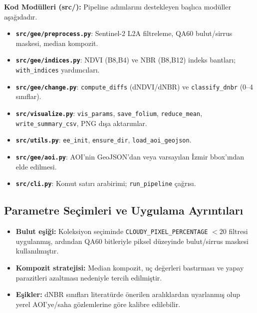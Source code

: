 \documentclass[11pt,a4paper]{article}
\begin{document}
\noindent\textbf{Kod Modülleri (src/):} Pipeline adımlarını destekleyen başlıca modüller aşağıdadır.
\begin{itemize}
  \item \textbf{\texttt{src/gee/preprocess.py}}: Sentinel-2 L2A filtreleme, QA60 bulut/sirrus maskesi, median kompozit.
  \item \textbf{\texttt{src/gee/indices.py}}: NDVI (B8,B4) ve NBR (B8,B12) indeks bantları; \texttt{with\_indices} yardımcıları.
  \item \textbf{\texttt{src/gee/change.py}}: \texttt{compute\_diffs} (dNDVI/dNBR) ve \texttt{classify\_dnbr} (0--4 sınıflar).
  \item \textbf{\texttt{src/visualize.py}}: \texttt{vis\_params}, \texttt{save\_folium}, \texttt{reduce\_mean}, \texttt{write\_summary\_csv}, PNG dışa aktarımlar.
  \item \textbf{\texttt{src/utils.py}}: \texttt{ee\_init}, \texttt{ensure\_dir}, \texttt{load\_aoi\_geojson}.
  \item \textbf{\texttt{src/gee/aoi.py}}: AOI'nin GeoJSON'dan veya varsayılan İzmir bbox'ından elde edilmesi.
  \item \textbf{\texttt{src/cli.py}}: Komut satırı arabirimi; \texttt{run\_pipeline} çağrısı.
\end{itemize}

\subsection{Parametre Seçimleri ve Uygulama Ayrıntıları}
\begin{itemize}
  \item \textbf{Bulut eşiği:} Koleksiyon seçiminde \texttt{CLOUDY\_PIXEL\_PERCENTAGE} $<20$
  filtresi uygulanmış, ardından QA60 bitleriyle piksel düzeyinde bulut/sirrus maskesi
  kullanılmıştır.
  \item \textbf{Kompozit stratejisi:} Median kompozit, uç değerleri bastırması ve
  yapay parazitleri azaltması nedeniyle tercih edilmiştir.
  \item \textbf{Eşikler:} dNBR sınıfları literatürde önerilen aralıklardan uyarlanmış
  olup yerel AOI’ye/saha gözlemlerine göre kalibre edilebilir.
\end{itemize}
\end{document}
